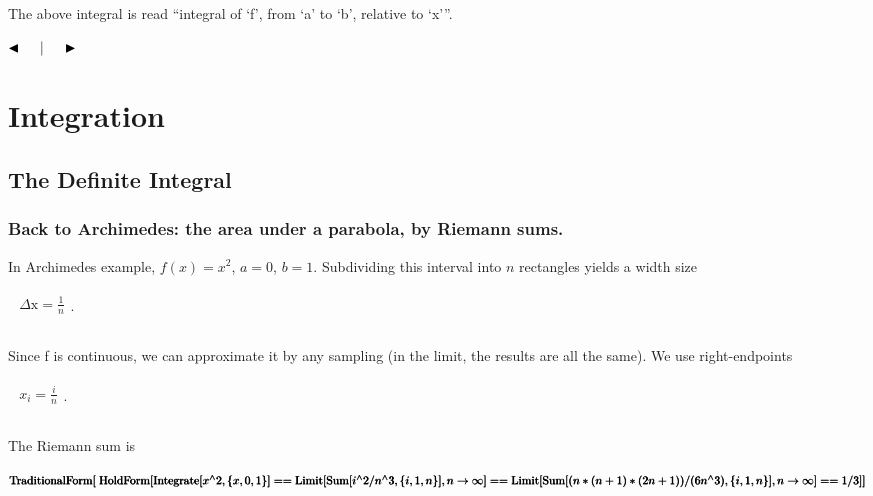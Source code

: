 \documentclass{article}
\begin{document}
The above integral is read {``}integral of {`}f{'}, from {`}a{'} to {`}b{'}, relative to {`}x{'}{''}.

$\blacktriangleleft \thickspace \thickspace \thickspace $$\thickspace \thickspace |\thickspace \thickspace $$\thickspace \thickspace \thickspace
\blacktriangleright $



\section*{Integration}

\subsection*{The Definite Integral}

\subsubsection*{Back to Archimedes: the area under a parabola, by Riemann sums.}

In Archimedes example, \(f(x)=x^2\), \(a=0\), \(b=1\). Subdividing this interval into \(n\) rectangles yields a width size 

\(\begin{array}{c}
 
\begin{array}{c}
 \text{$\Delta $x}=\frac{1}{n} \\
\end{array}
. \\
\end{array}\)

Since f is continuous, we can approximate it by any sampling (in the limit, the results are all the same). We use right-endpoints

\(\begin{array}{c}
 
\begin{array}{c}
 x_i=\frac{i}{n} \\
\end{array}
. \\
\end{array}\)

The Riemann sum is 

\begin{doublespace}
\noindent\(\pmb{\text{TraditionalForm}[}\\
\pmb{\text{HoldForm}[\text{Integrate}[x{}^{\wedge}2,\{x,0,1\}]==\text{Limit}[\text{Sum}[i{}^{\wedge}2/n{}^{\wedge}3,\{i,1,n\}],n\to  \infty ]== }\\
\pmb{\text{Limit}[\text{Sum}[(n*(n+1)*(2n+1))/(6n{}^{\wedge}3),\{i,1,n\}],n\to  \infty ]==1/3 ]]}\)
\end{doublespace}
\end{document}
